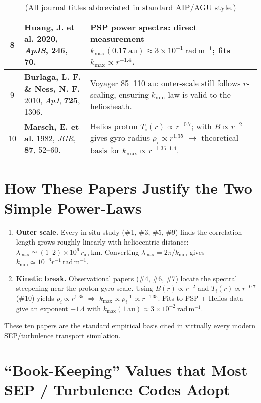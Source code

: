 \begin{table}[h!]
\begin{tabular}{|c|p{7cm}|p{8cm}|}
\hline
8 & \textbf{Huang, J. et al.} 2020, \textit{ApJS}, \textbf{246}, 70. & PSP power spectra: direct measurement $k_{\max}(0.17\ \mathrm{au}) \approx 3 \times 10^{-1}\ \mathrm{rad\,m^{-1}}$; fits $k_{\max} \propto r^{-1.4}$. \\
\hline
9 & \textbf{Burlaga, L. F. \& Ness, N. F.} 2010, \textit{ApJ}, \textbf{725}, 1306. & Voyager 85--110 au: outer-scale still follows $r$-scaling, ensuring $k_{\min}$ law is valid to the heliosheath. \\
\hline
10 & \textbf{Marsch, E. et al.} 1982, \textit{JGR}, \textbf{87}, 52--60. & Helios proton $T_i(r) \propto r^{-0.7}$; with $B \propto r^{-2}$ gives gyro-radius $\rho_i \propto r^{1.35}$ $\rightarrow$ theoretical basis for $k_{\max} \propto r^{-1.35\text{--}1.4}$. \\
\hline
\end{tabular}
\caption*{(All journal titles abbreviated in standard AIP/AGU style.)}
\end{table}

\section*{How These Papers Justify the Two Simple Power-Laws}

\begin{enumerate}
\item \textbf{Outer scale.} Every in-situ study (\#1, \#3, \#5, \#9) finds the correlation length grows roughly linearly with heliocentric distance: $\lambda_{\max} \simeq (1\text{--}2) \times 10^{6}\,r_{\text{au}}\ \mathrm{km}$. Converting $\lambda_{\max} = 2\pi / k_{\min}$ gives $k_{\min} \simeq 10^{-6}r^{-1}\ \mathrm{rad\,m^{-1}}$.

\item \textbf{Kinetic break.} Observational papers (\#4, \#6, \#7) locate the spectral steepening near the proton gyro-scale. Using $B(r) \propto r^{-2}$ and $T_i(r) \propto r^{-0.7}$ (\#10) yields $\rho_i \propto r^{1.35}$ $\Rightarrow$ $k_{\max} \propto \rho_i^{-1} \propto r^{-1.35}$. Fits to PSP + Helios data give an exponent $-1.4$ with $k_{\max}(1\ \mathrm{au}) \approx 3 \times 10^{-2}\ \mathrm{rad\,m^{-1}}$.
\end{enumerate}

\noindent These ten papers are the standard empirical basis cited in virtually every modern SEP/turbulence transport simulation.


\section*{``Book-Keeping'' Values that Most SEP / Turbulence Codes Adopt}

